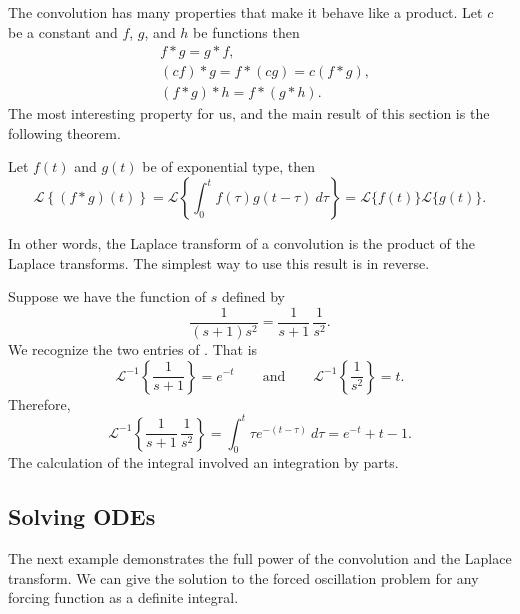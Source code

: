 \documentclass[12pt]{book}
\begin{document}
The convolution has many properties that make it behave like a product.
Let $c$ be a constant and $f$, $g$, and $h$ be functions then
\begin{align*}
& f * g = g * f , \\
& (c f) * g = f * (c g) = c (f*g) , \\
& ( f * g ) * h = f * ( g * h ) .
\end{align*}
The most interesting property for us, and
the main result of this section is the following theorem.

\begin{theorem}
Let $f(t)$ and $g(t)$ be of exponential type, then
\begin{equation*}
\boxed{~~
\mathcal{L} \left\{ (f*g)(t) \right\}
=
\mathcal{L} \left\{ \int_0^t f(\tau) g(t-\tau) ~ d\tau \right\}
=
\mathcal{L} \{ f(t) \} \mathcal{L} \{ g(t) \} .
~~}
\end{equation*}
\end{theorem}

In other words, the Laplace transform of a convolution is the product
of the Laplace transforms.  The simplest way to use this result is in
reverse.

\begin{example}
Suppose we have the function of $s$
defined by
\begin{equation*}
\frac{1}{(s+1)s^2} = 
\frac{1}{s+1}\,
\frac{1}{s^2} .
\end{equation*}
We recognize the two entries of .  That is
\begin{equation*}
\mathcal{L}^{-1} 
\left\{
\frac{1}{s+1} \right\}
= e^{-t}
\qquad \text{and} \qquad
\mathcal{L}^{-1} 
\left\{
\frac{1}{s^2} \right\} 
= t.
\end{equation*}
Therefore,
\begin{equation*}
\mathcal{L}^{-1}
\left\{
\frac{1}{s+1}\,
\frac{1}{s^2} \right\}
=
\int_0^t
\tau e^{-(t-\tau)} ~d\tau
=
e^{-t}+t-1 .
\end{equation*}
The calculation of the integral involved an integration by parts.
\end{example}

\subsection{Solving ODEs}

The next example demonstrates the full power of the convolution and
the Laplace transform.  We can give the solution to
the forced oscillation problem for any forcing function as a definite
integral.
\end{document}
